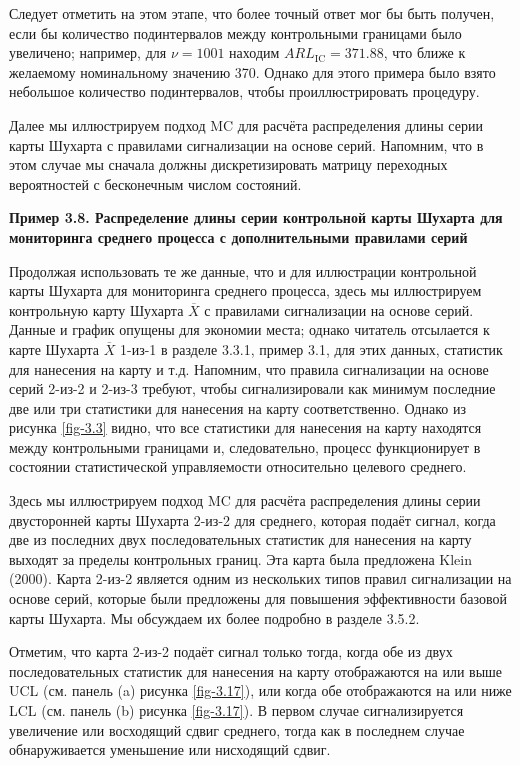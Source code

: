 Следует отметить на этом этапе, что более точный ответ мог бы быть получен, если бы количество подинтервалов между контрольными границами было увеличено; например, для \(\nu = 1001\) находим \(ARL_{\text{IC}} = 371.88\), что ближе к желаемому номинальному значению 370. Однако для этого примера было взято небольшое количество подинтервалов, чтобы проиллюстрировать процедуру.

Далее мы иллюстрируем подход MC для расчёта распределения длины серии карты Шухарта с правилами сигнализации на основе серий. Напомним, что в этом случае мы сначала должны дискретизировать матрицу переходных вероятностей с бесконечным числом состояний.

\noindent\textbf{Пример 3.8. Распределение длины серии контрольной карты Шухарта для мониторинга среднего процесса с дополнительными правилами серий}

Продолжая использовать те же данные, что и для иллюстрации контрольной карты Шухарта для мониторинга среднего процесса, здесь мы иллюстрируем контрольную карту Шухарта \(\overline{X}\) с правилами сигнализации на основе серий. Данные и график опущены для экономии места; однако читатель отсылается к карте Шухарта \(\overline{X}\) 1-из-1 в разделе 3.3.1, пример 3.1, для этих данных, статистик для нанесения на карту и т.д. Напомним, что правила сигнализации на основе серий 2-из-2 и 2-из-3 требуют, чтобы сигнализировали как минимум последние две или три статистики для нанесения на карту соответственно. Однако из рисунка \ref{fig-3.3} видно, что все статистики для нанесения на карту находятся между контрольными границами и, следовательно, процесс функционирует в состоянии статистической управляемости относительно целевого среднего.

Здесь мы иллюстрируем подход MC для расчёта распределения длины серии двусторонней карты Шухарта 2-из-2 для среднего, которая подаёт сигнал, когда две из последних двух последовательных статистик для нанесения на карту выходят за пределы контрольных границ. Эта карта была предложена Klein (2000). Карта 2-из-2 является одним из нескольких типов правил сигнализации на основе серий, которые были предложены для повышения эффективности базовой карты Шухарта. Мы обсуждаем их более подробно в разделе 3.5.2.

Отметим, что карта 2-из-2 подаёт сигнал только тогда, когда обе из двух последовательных статистик для нанесения на карту отображаются на или выше UCL (см. панель (a) рисунка \ref{fig-3.17}), или когда обе отображаются на или ниже LCL (см. панель (b) рисунка \ref{fig-3.17}). В первом случае сигнализируется увеличение или восходящий сдвиг среднего, тогда как в последнем случае обнаруживается уменьшение или нисходящий сдвиг.

